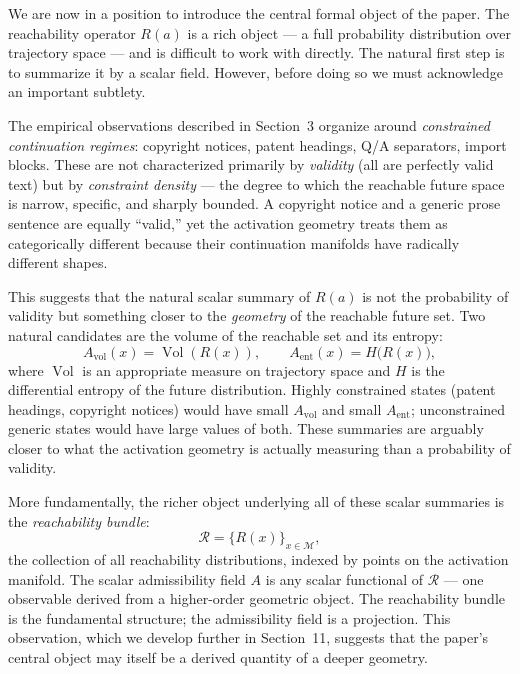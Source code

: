 \documentclass[12pt, a4paper]{article}
\theoremstyle{plain}
\theoremstyle{definition}
\theoremstyle{remark}
\newcommand{\cM}{\mathcal{M}}
\newcommand{\fA}{A}
\newcommand{\reachset}[1]{R(#1)}
\begin{document}
We are now in a position to introduce the central formal object of the paper.
The reachability operator $\reachset{a}$ is a rich object --- a full
probability distribution over trajectory space --- and is difficult to work
with directly. The natural first step is to summarize it by a scalar field.
However, before doing so we must acknowledge an important subtlety.

The empirical observations described in Section~3 organize around
\emph{constrained continuation regimes}: copyright notices, patent headings,
Q/A separators, import blocks. These are not characterized primarily by
\emph{validity} (all are perfectly valid text) but by \emph{constraint density}
--- the degree to which the reachable future space is narrow, specific, and
sharply bounded. A copyright notice and a generic prose sentence are equally
``valid,'' yet the activation geometry treats them as categorically different
because their continuation manifolds have radically different shapes.

This suggests that the natural scalar summary of $\reachset{a}$ is not the
probability of validity but something closer to the \emph{geometry} of the
reachable future set. Two natural candidates are the volume of the reachable
set and its entropy:
\begin{equation}
  \fA_{\mathrm{vol}}(x) = \operatorname{Vol}(R(x)),
  \qquad
  \fA_{\mathrm{ent}}(x) = H\bigl(\reachset{x}\bigr),
\end{equation}
where $\operatorname{Vol}$ is an appropriate measure on trajectory space and
$H$ is the differential entropy of the future distribution. Highly constrained
states (patent headings, copyright notices) would have small $\fA_{\mathrm{vol}}$
and small $\fA_{\mathrm{ent}}$; unconstrained generic states would have large
values of both. These summaries are arguably closer to what the activation
geometry is actually measuring than a probability of validity.

More fundamentally, the richer object underlying all of these scalar summaries
is the \emph{reachability bundle}:
\begin{equation}
  \mathcal{R} = \bigl\{ R(x) \bigr\}_{x \in \cM},
\end{equation}
the collection of all reachability distributions, indexed by points on the
activation manifold. The scalar admissibility field $\fA$ is any scalar
functional of $\mathcal{R}$ --- one observable derived from a higher-order
geometric object. The reachability bundle is the fundamental structure; the
admissibility field is a projection. This observation, which we develop further
in Section~11, suggests that the paper's central object may itself be a derived
quantity of a deeper geometry.
\end{document}
